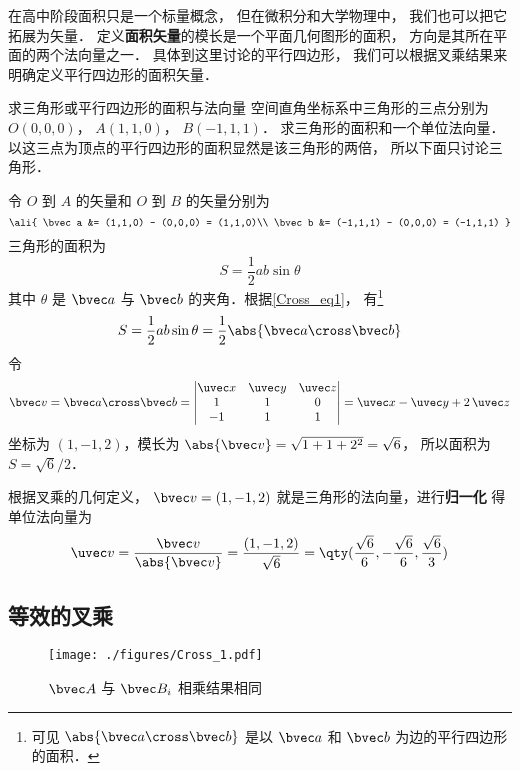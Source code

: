 在高中阶段面积只是一个标量概念， 但在微积分和大学物理中， 我们也可以把它拓展为矢量． 定义\textbf{面积矢量}的模长是一个平面几何图形的面积， 方向是其所在平面的两个法向量之一． 具体到这里讨论的平行四边形， 我们可以根据叉乘结果来明确定义平行四边形的面积矢量．

\begin{example}{求三角形或平行四边形的面积与法向量}\label{Cross_ex1}
空间直角坐标系中三角形的三点分别为 $O(0,0,0)$，  $A(1,1,0)$，  $B(-1,1,1)$． 求三角形的面积和一个单位法向量． 以这三点为顶点的平行四边形的面积显然是该三角形的两倍， 所以下面只讨论三角形．

令 $O$ 到 $A$ 的矢量和  $O$ 到 $B$ 的矢量分别为
\begin{equation}
\ali{
\bvec a  &= (1,1,0) - (0,0,0) = (1,1,0)\\
\bvec b  &= (-1,1,1) - (0,0,0) = (-1,1,1)
}\end{equation}
三角形的面积为
 \begin{equation}
S = \frac12 ab \sin \theta 
\end{equation}
其中 $\theta $ 是 $\bvec a$ 与 $\bvec b$ 的夹角．根据\autoref{Cross_eq1}， 有\footnote{可见 $\abs{\bvec a\cross\bvec b}$ 是以 $\bvec a$ 和 $\bvec b$ 为边的平行四边形的面积．}
\begin{equation}
S = \frac12 ab \sin \theta  = \frac12 \abs{\bvec a\cross\bvec b}
\end{equation}
令
\begin{equation}
\bvec v = \bvec a \cross \bvec b = 
\begin{vmatrix} \uvec x & \uvec y & \uvec z \\ 1&1&0\\-1&1&1 \end{vmatrix}
= \uvec x - \uvec y + 2\,\uvec z 
\end{equation}
坐标为 $(1,-1,2)$，模长为 $\abs{\bvec v} = \sqrt{1 + 1 + 2^2} = \sqrt 6$， 所以面积为 $S = \sqrt 6 /2$． 

根据叉乘的几何定义， $\bvec v = (1,-1,2)$ 就是三角形的法向量，进行\textbf{归一化}
得单位法向量为
 \begin{equation}
\uvec v = \frac{\bvec v}{\abs{\bvec v}} = \frac{(1,-1,2)}{\sqrt 6} = \qty( \frac{\sqrt 6 }{6}, - \frac{\sqrt 6 }{6}, \frac{\sqrt 6 }{3} )
\end{equation}
\end{example}

\subsection{等效的叉乘}\label{Cross_sub1}
\begin{figure}[ht]
\centering
\texttt{[image: ./figures/Cross\_1.pdf]}
\caption{$\bvec A$ 与 $\bvec B_i$ 相乘结果相同} \label{Cross_fig1}
\end{figure}

